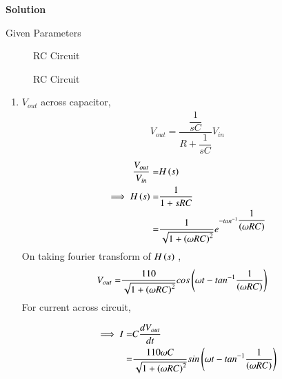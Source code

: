 \documentclass[journal,12pt,twocolumn]{IEEEtran}
\theoremstyle{remark}
\begin{document}
\textbf{Solution}
\begin{table}[!h]
	\centering
	
	\vspace{6 pt}
	\caption{Given Parameters}
	\label{tab:enter-label}
\end{table}
\begin{figure}[!h]
	\centering
	
	\caption{RC Circuit}
	\label{fig:1}
\end{figure}
\vspace{2cm}
\begin{figure}[!h]
	\centering
	
	\caption{RC Circuit}
	\label{fig:2}
\end{figure}
\begin{enumerate} [label = (\alph*)]
\item $V_{out }$ across capacitor,
\begin{align}
 V_{out}=\dfrac{\dfrac{1}{sC}}{ R + \dfrac{1}{sC}}
 V_{in}
\end{align}
\begin{align}
\dfrac{V_{out}}{V_{in}} =& H\left(s\right)\\
\implies H\left(s\right) =& \dfrac{1}{1+sRC}\\
                    =& \dfrac{1}{\sqrt{1+\left(\omega RC\right)^2}}e^{-tan^{-1}\dfrac{1}{\left(\omega RC\right)}}
\end{align}
On taking fourier transform of $H\left(s\right)$ ,
\begin{align}
V_{out} =& \dfrac{110}{\sqrt{1+\left(\omega RC\right)^2}}cos\left(\omega t - tan^{-1}\dfrac{1}{\left(\omega RC\right)}\right)
\end{align}
For current across circuit,

\begin{align} 
\implies I=& C\dfrac{dV_{out}}{dt} \\ 
         =& \dfrac{110\omega C}{\sqrt{1+\left(\omega RC\right)^2}} sin\left(\omega t - tan^{-1}\dfrac{1}{\left(\omega RC\right)}\right)
\end{align}


\end{enumerate}
\end{document}
